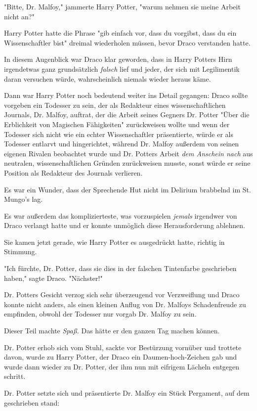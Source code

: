 {"Bitte, Dr. Malfoy," jammerte Harry Potter, "warum nehmen sie meine Arbeit nicht an?"

Harry Potter hatte die Phrase "gib einfach vor, dass du vorgibst, dass du ein Wissenschaftler bist" dreimal wiederholen müssen, bevor Draco verstanden hatte.

In diesem Augenblick war Draco klar geworden, dass in Harry Potters Hirn irgendetwas ganz grundsätzlich \emph{falsch} lief und jeder, der sich mit Legilimentik daran versuchen würde, wahrscheinlich niemals wieder heraus käme.

Dann war Harry Potter noch bedeutend weiter ins Detail gegangen: Draco sollte vorgeben ein Todesser zu sein, der als Redakteur eines wissenschaftlichen Journals, Dr. Malfoy, auftrat, der die Arbeit seines Gegners Dr. Potter "Über die Erblichkeit von Magischen Fähigkeiten" zurückweisen wollte und wenn der Todesser sich nicht wie ein echter Wissenschaftler präsentierte, würde er als Todesser entlarvt und hingerichtet, während Dr. Malfoy außerdem von seinen eigenen Rivalen beobachtet wurde und Dr. Potters Arbeit \emph{dem Anschein nach} aus neutralen, wissenschaftlichen Gründen zurückweisen musste, sonst würde er seine Position als Redakteur des Journals verlieren.

Es war ein Wunder, dass der Sprechende Hut nicht im Delirium brabbelnd im St. Mungo's lag.

Es war außerdem das komplizierteste, was vorzuspielen \emph{jemals} irgendwer von Draco verlangt hatte und er konnte unmöglich diese Herausforderung ablehnen.

Sie kamen jetzt gerade, wie Harry Potter es ausgedrückt hatte, richtig in Stimmung.

"Ich fürchte, Dr. Potter, dass sie dies in der falschen Tintenfarbe geschrieben haben," sagte Draco. "Nächster!"

Dr. Potters Gesicht verzog sich sehr überzeugend vor Verzweiflung und Draco konnte nicht anders, als einen kleinen Anflug von Dr. Malfoys Schadenfreude zu empfinden, obwohl der Todesser nur vorgab Dr. Malfoy zu sein.

Dieser Teil machte \emph{Spaß.} Das hätte er den ganzen Tag machen können.

Dr. Potter erhob sich vom Stuhl, sackte vor Bestürzung vornüber und trottete davon, wurde zu Harry Potter, der Draco ein Daumen-hoch-Zeichen gab und wurde dann wieder zu Dr. Potter, der ihm nun mit eifrigem Lächeln entgegen schritt.

Dr. Potter setzte sich und präsentierte Dr. Malfoy ein Stück Pergament, auf dem geschrieben stand:

}
